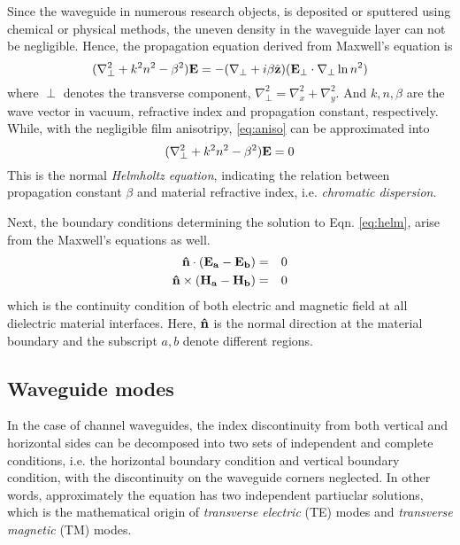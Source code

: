 Since the waveguide in numerous research objects, is deposited or sputtered using chemical or physical methods, the uneven density in the waveguide layer can not be negligible. Hence, the propagation equation derived from Maxwell's equation is
\begin{equation}\label{eq:aniso}
  (\nabla_{\perp}^2 + k^2 n^2 - \beta^2) \vb{E} = - (\nabla_{\perp} + i
  \beta \hat{\vb{z}}) (\vb{E_{\perp}}  \cdot \nabla_{\perp} \ln
  n^2)
\end{equation}
where $\perp$ denotes the transverse component, $\nabla_{\perp}^2 = \nabla_x^2 + \nabla_y^2$. And $k, n, \beta$ are the wave vector in vacuum, refractive index and propagation constant, respectively. While, with the negligible film anisotripy, \autoref{eq:aniso} can be approximated into
\begin{equation}\label{eq:helm}
  (\nabla_{\perp}^2 + k^2 n^2 - \beta^2) \vb{E} = 0
\end{equation}
This is the normal \textit{Helmholtz equation}, indicating the relation between propagation constant $\beta$ and material refractive index, i.e. \textit{chromatic dispersion}.

Next, the boundary conditions determining the solution to Eqn. \ref{eq:helm}, arise from the Maxwell's equations as well.
\begin{eqnarray*}%
  \vb{\hat{n}} \cdot (\vb{E_a - E_b}) & = & 0 \\
  \vb{\hat{n}} \times (\vb{\vb{H_a} - H_{\vb{b}}}) & = & 0
\end{eqnarray*}
which is the continuity condition of both electric and magnetic field at all dielectric material interfaces. Here, $\vb{\hat{n}}$ is the normal direction at the material boundary and the subscript $a, b$ denote different regions.

\subsection{Waveguide modes}
In the case of channel waveguides, the index discontinuity from both vertical and horizontal sides can be decomposed into two sets of independent and complete conditions, i.e. the horizontal boundary condition and vertical boundary condition, with the discontinuity on the waveguide corners neglected. In other words, approximately the equation has two independent partiuclar solutions, which is the mathematical origin of \textit{ transverse electric} (TE) modes and \textit{transverse magnetic} (TM) modes.

